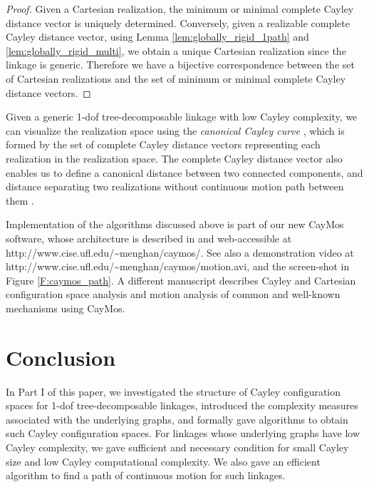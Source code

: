 \documentclass[secthm,amsthm,english]{article}
\theoremstyle{definition}
\theoremstyle{remark}
\begin{document}
\vspace{-10pt}

\begin{proof}
Given a Cartesian realization, 
the minimum or minimal complete Cayley distance vector is  uniquely determined.
Conversely, given a realizable complete Cayley distance vector, 
using Lemma \ref{lem:globally_rigid_1path} and 
 \ref{lem:globally_rigid_multi}, 
we  obtain a unique Cartesian realization
since the linkage is generic. 
Therefore we have a bijective correspondence between the set of Cartesian realizations 
and the set of minimum or minimal complete Cayley distance vectors. 
\end{proof}




Given a generic 1-dof tree-decomposable linkage with low Cayley complexity,
we can visualize the realization space using the \emph{canonical Cayley curve} \cite{bib:beest},
which is formed by the set of complete Cayley distance vectors 
representing each realization in the realization space.
The complete Cayley distance vector also enables us
to define a canonical distance between two connected components,
and distance separating two realizations without continuous motion path between them \cite{bib:beest}.


\bigskip
\noindent 
Implementation of the algorithms  discussed above 
is part of our new CayMos software,
whose architecture is described in \cite{bib:caymos} and 
web-accessible at http://www.cise.ufl.edu/\~{}menghan/caymos/. 
See also a demonstration video at http://www.cise.ufl.edu/\~{}menghan/caymos/motion.avi, 
and the screen-shot in Figure \ref{F:caymos_path}. 
A different manuscript \cite{bib:beest} describes Cayley and Cartesian configuration space analysis and motion analysis 
of common and well-known mechanisms using CayMos.






\section{Conclusion}

In Part I of this paper, 
we investigated the structure of Cayley configuration spaces for 1-dof tree-decomposable linkages, 
introduced the complexity measures associated with the underlying graphs, 
and formally gave algorithms to obtain such Cayley configuration spaces. 
For linkages whose underlying graphs have low Cayley complexity, 
we gave sufficient and necessary condition for small Cayley size and low Cayley computational complexity. 
We also gave an efficient algorithm to find a path of continuous motion for such linkages.
\end{document}
